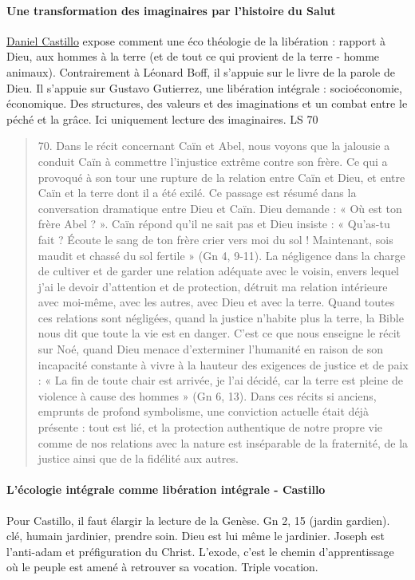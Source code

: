 \paragraph{Une transformation des imaginaires par l'histoire du Salut} 
\href{https://www.loyola.edu/academics/theology/faculty/castillo}{Daniel Castillo} expose comment une éco théologie  de la libération : rapport à Dieu, aux hommes à la terre (et de tout ce qui provient de la terre - homme animaux). Contrairement à Léonard Boff, il s'appuie sur le livre de la parole de Dieu. Il s'appuie sur Gustavo Gutierrez, une libération intégrale : socioéconomie, économique. Des structures, des valeurs et des imaginations et un combat entre le péché et la grâce.
Ici uniquement lecture des imaginaires.
LS 70
\begin{quote}
    70. Dans le récit concernant Caïn et Abel, nous voyons que la jalousie a conduit Caïn à commettre l’injustice extrême contre son frère. Ce qui a provoqué à son tour une rupture de la relation entre Caïn et Dieu, et entre Caïn et la terre dont il a été exilé. Ce passage est résumé dans la conversation dramatique entre Dieu et Caïn. Dieu demande : « Où est ton frère Abel ? ». Caïn répond qu’il ne sait pas et Dieu insiste : « Qu’as-tu fait ? Écoute le sang de ton frère crier vers moi du sol ! Maintenant, sois maudit et chassé du sol fertile » (Gn 4, 9-11). La négligence dans la charge de cultiver et de garder une relation adéquate avec le voisin, envers lequel j’ai le devoir d’attention et de protection, détruit ma relation intérieure avec moi-même, avec les autres, avec Dieu et avec la terre. Quand toutes ces relations sont négligées, quand la justice n’habite plus la terre, la Bible nous dit que toute la vie est en danger. C’est ce que nous enseigne le récit sur Noé, quand Dieu menace d’exterminer l’humanité en raison de son incapacité constante à vivre à la hauteur des exigences de justice et de paix : « La fin de toute chair est arrivée, je l’ai décidé, car la terre est pleine de violence à cause des hommes » (Gn 6, 13). Dans ces récits si anciens, emprunts de profond symbolisme, une conviction actuelle était déjà présente : tout est lié, et la protection authentique de notre propre vie comme de nos relations avec la nature est inséparable de la fraternité, de la justice ainsi que de la fidélité aux autres.
\end{quote}

\paragraph{L'écologie intégrale comme libération intégrale - Castillo}
Pour Castillo, il faut élargir la lecture de la Genèse. Gn 2, 15 (jardin gardien). clé, humain jardinier, prendre soin.  Dieu est lui même le jardinier. Joseph est l'anti-adam et préfiguration du Christ.  L'exode, c'est le chemin d'apprentissage où le peuple est amené à retrouver sa vocation. Triple vocation.  

